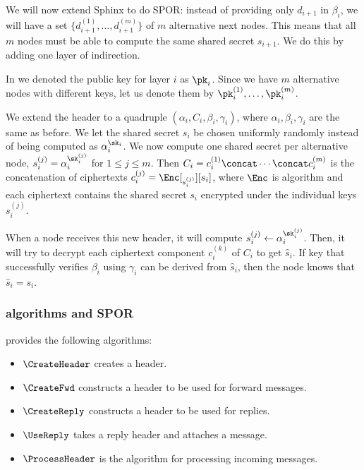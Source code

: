 We will now extend Sphinx to do \ac{SPOR}: instead of providing only \(d_{i+1}\) 
in \(\beta_i\), we will have a set \(\{d_{i+1}^{(1)}, \dotsc, d_{i+1}^{(m)}\}\) 
of \(m\) alternative next nodes.
This means that all \(m\) nodes must be able to compute the same shared secret 
\(s_{i+1}\).
We do this by adding one layer of indirection.

In \sphinxes we denoted the public key for layer \(i\) as \(\pk_i\).
Since we have \(m\) alternative nodes with different keys, let us denote them 
by \(\pk_i^{(1)}, \dotsc, \pk_i^{(m)}\).

We extend the header to a quadruple \((\alpha_i, C_i, \beta_i, \gamma_i)\), 
where \(\alpha_i, \beta_i, \gamma_i\) are the same as before.
We let the shared secret \(s_i\) be chosen uniformly randomly instead of being 
computed as \(\alpha_i^{\sk_i}\).
We now compute one shared secret per alternative node, \ie \(s_i^{(j)} = 
  \alpha_i^{\sk_i^{(j)}}\) for \(1\leq j\leq m\).
Then \(C_i = c_i^{(1)}\concat \dotsb\concat c_i^{(m)}\) is the concatenation of 
ciphertexts \(c_i^{(j)} = \Enc[_{s_i^{(j)}}][s_i]\), where \(\Enc\) is 
 algorithm and each ciphertext contains the shared secret \(s_i\) 
encrypted under the individual keys \(s_i^{(j)}\). 

When a node receives this new header, it will compute \(s_i^{(j)}\gets 
  \alpha_i^{\sk_i^{(j)}}\).
Then, it will try to decrypt each ciphertext component \(c_i^{(k)}\) of \(C_i\) 
to get \(\hat s_i\).
If  key that successfully verifies \(\beta_i\) using \(\gamma_i\) can 
be derived from \(\hat s_i\), then the node knows that \(\hat s_i = s_i\).


\subsubsection{\Sphinxes algorithms and \acf*{SPOR}}

\Sphinxes provides the following algorithms:
\begin{itemize}
  \item \(\CreateHeader\) creates a header.

  \item \(\CreateFwd\) constructs a header to be used for forward messages.

  \item \(\CreateReply\) constructs a header to be used for replies.

  \item \(\UseReply\) takes a reply header and attaches a message.

  \item \(\ProcessHeader\) is the algorithm for processing incoming messages.
\end{itemize}

